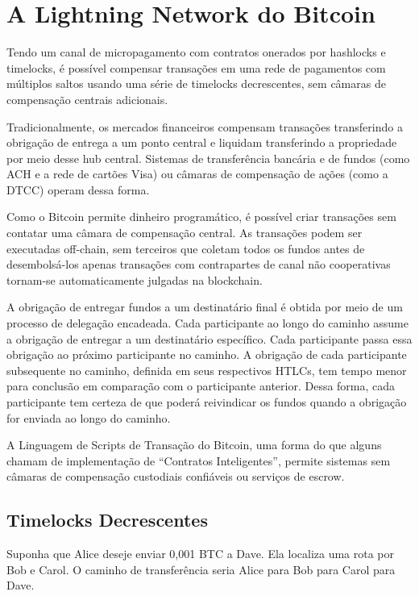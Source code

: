 \documentclass[letterpaper,11pt]{article}
\begin{document}
\section{A Lightning Network do Bitcoin}

Tendo um canal de micropagamento com contratos onerados por hashlocks e
timelocks, é possível compensar transações em uma rede de pagamentos com
múltiplos saltos usando uma série de timelocks decrescentes, sem câmaras
de compensação centrais adicionais.

Tradicionalmente, os mercados financeiros compensam transações
transferindo a obrigação de entrega a um ponto central e liquidam
transferindo a propriedade por meio desse hub central. Sistemas de
transferência bancária e de fundos (como ACH e a rede de cartões Visa) ou
câmaras de compensação de ações (como a DTCC) operam dessa forma.

Como o Bitcoin permite dinheiro programático, é possível criar transações
sem contatar uma câmara de compensação central. As transações podem ser
executadas off-chain, sem terceiros que coletam todos os fundos antes de
desembolsá-los \textemdash apenas transações com contrapartes de canal não
cooperativas tornam-se automaticamente julgadas na blockchain.

A obrigação de entregar fundos a um destinatário final é obtida por meio
de um processo de delegação encadeada. Cada participante ao longo do
caminho assume a obrigação de entregar a um destinatário específico. Cada
participante passa essa obrigação ao próximo participante no caminho. A
obrigação de cada participante subsequente no caminho, definida em seus
respectivos HTLCs, tem tempo menor para conclusão em comparação com o
participante anterior. Dessa forma, cada participante tem certeza de que
poderá reivindicar os fundos quando a obrigação for enviada ao longo do
caminho.

A Linguagem de Scripts de Transação do Bitcoin, uma forma do que alguns
chamam de implementação de ``Contratos Inteligentes''\cite{smartcontracts},
permite sistemas sem câmaras de compensação custodiais confiáveis ou
serviços de escrow.

\subsection{Timelocks Decrescentes}

Suponha que Alice deseje enviar 0,001 BTC a Dave. Ela localiza uma rota por
Bob e Carol. O caminho de transferência seria Alice para Bob para Carol
para Dave.
\end{document}
